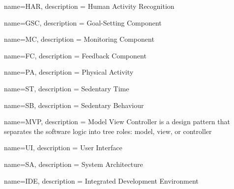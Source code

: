 
{
  name=HAR,
  description = {Human Activity Recognition}
}

{
    name=GSC,
    description = {Goal-Setting Component}
}

{
    name=MC,
    description = {Monitoring Component}
}

{
    name=FC,
    description = {Feedback Component}
}

{
    name=PA,
    description = {Physical Activity}
}

{
    name=ST,
    description = {Sedentary Time}
}

{
    name=SB,
    description = {Sedentary Behaviour}
}

{
    name=MVP,
    description = {Model View Controller is a design pattern that separates the software logic into tree roles: model, view, or controller}
}

{
    name=UI,
    description = {User Interface}
}

{
    name=SA,
    description = {System Architecture}
}

{
    name=IDE,
    description = {Integrated Development Environment}
}

\glsaddall %
\printglossaries
